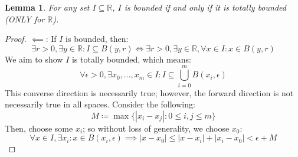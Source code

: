 \documentclass[10pt,letterpaper]{article} %
\newtheorem{lem}{Lemma}[section]
\begin{document}
\begin{lem}
For any set $I \subseteq \mathbb{R}$, $I$ is bounded if and only if it is totally bounded (ONLY for $\mathbb{R}$).
\end{lem}
\begin{proof}
$\impliedby$: If $I$ is bounded, then:
\begin{equation*}
\exists r > 0, \exists y \in \mathbb{R}: I \subseteq B(y, r) \iff \exists r > 0, \exists y \in \mathbb{R}, \forall x \in I: x \in B(y, r)
\end{equation*}
We aim to show $I$ is totally bounded, which means:
\begin{equation*}
\forall \epsilon > 0, \exists x_0, ..., x_m \in I: I \subseteq \bigcup_{i=0}^{m}B(x_i, \epsilon)
\end{equation*}
This converse direction is necessarily true; however, the forward direction is not necessarily true in all spaces. Consider the following:
\begin{equation*}
M \coloneq \max\{|x_i - x_j| : 0 \leqslant i, j \leqslant m\}
\end{equation*}
Then, choose some $x_i$; so without loss of generality, we choose $x_0$:
\begin{equation*}
\forall x \in I, \exists x_i: x \in B(x_i, \epsilon) \implies |x-x_0| \leqslant |x-x_i| + |x_i - x_0| < \epsilon + M
\end{equation*}


\end{proof}
\end{document}
